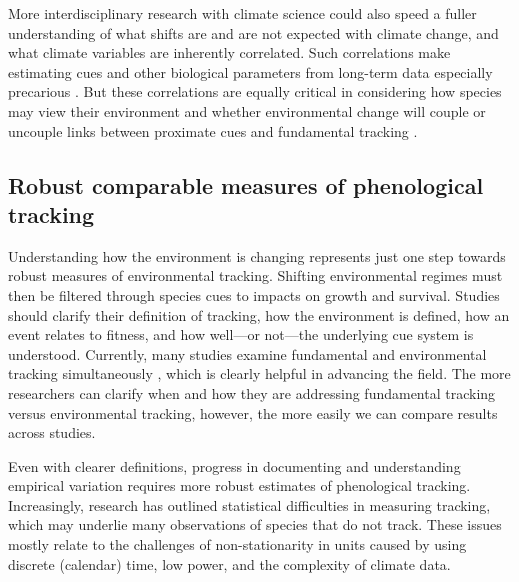\documentclass[11pt,letterpaper]{article}
\begin{document}
More interdisciplinary research with climate science could also speed a fuller understanding of what shifts are and are not expected with climate change, and what climate variables are inherently correlated. Such correlations make estimating cues and other biological parameters from long-term data especially precarious \citep{tansey2017}. But these correlations are equally critical in considering how species may view their environment and whether environmental change will couple or uncouple links between proximate cues and fundamental tracking \citep{bonamour2019}. 

\subsection{Robust comparable measures of phenological tracking} 
Understanding how the environment is changing represents just one step towards robust measures of environmental tracking. Shifting environmental regimes must then be filtered through species cues to impacts on growth and survival. Studies should clarify their definition of tracking, how the environment is defined, how an event relates to fitness, and how well---or not---the underlying cue system is understood. Currently, many studies examine fundamental and environmental tracking simultaneously \citep[e.g.,][]{visser2006,charm2008,Cleland:2012,yang2020}, which is clearly helpful in advancing the field. The more researchers can clarify when and how they are addressing fundamental tracking versus environmental tracking, however, the more easily we can compare results across studies. 

Even with clearer definitions, progress in documenting and understanding empirical variation requires more robust estimates of phenological tracking. Increasingly, research has outlined statistical difficulties in measuring tracking, which may underlie many observations of species that do not track. These issues mostly relate to the challenges of non-stationarity in units caused by using discrete (calendar) time, low power, and the complexity of climate data. 
\end{document}
